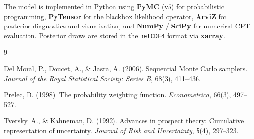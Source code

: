 \documentclass[12pt, a4paper]{article}
\begin{document}
The model is implemented in Python using
\textbf{PyMC} (v5) for probabilistic programming,
\textbf{PyTensor} for the blackbox likelihood operator,
\textbf{ArviZ} for posterior diagnostics and visualisation, and
\textbf{NumPy} / \textbf{SciPy} for numerical CPT evaluation.
Posterior draws are stored in the \texttt{netCDF4} format via
\textbf{xarray}.


\begin{thebibliography}{9}

Del Moral, P., Doucet, A., \& Jasra, A. (2006).
Sequential Monte Carlo samplers.
\textit{Journal of the Royal Statistical Society: Series B}, 68(3), 411--436.

Prelec, D. (1998).
The probability weighting function.
\textit{Econometrica}, 66(3), 497--527.

Tversky, A., \& Kahneman, D. (1992).
Advances in prospect theory: Cumulative representation of uncertainty.
\textit{Journal of Risk and Uncertainty}, 5(4), 297--323.

\end{thebibliography}
\end{document}
